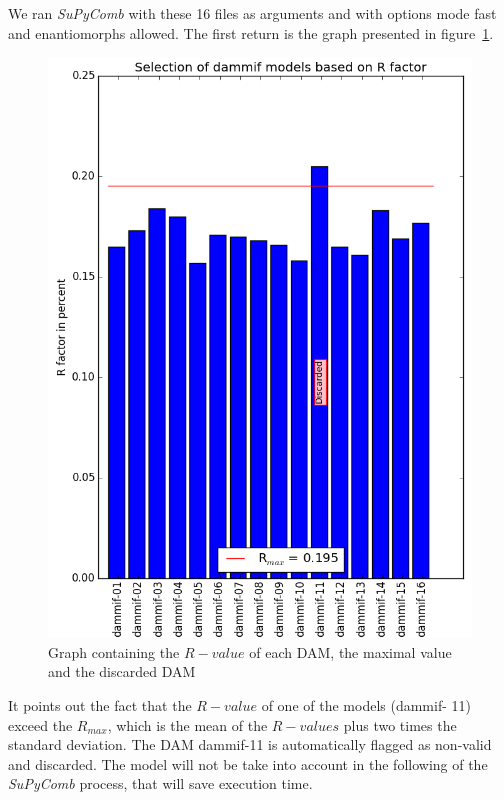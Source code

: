 \documentclass[a4paper, 11pt]{report}
\begin{document}
We ran \textit{SuPyComb} with these 16 files as arguments and with 
options mode fast and enantiomorphs allowed. 
The first return is the graph presented in figure~\ref{fgr:rfactor}. 
\begin{figure}
\centering
\includegraphics[scale=0.6]{Rfactor.png}
\caption{Graph containing the $R-value$ of each DAM, the maximal value 
         and the discarded DAM}
\label{fgr:rfactor}
\end{figure}
It points out the fact that the $R-value$ of one of the models (dammif-
11) exceed the $R_{max}$, which is the mean of the $R-values$ plus two 
times the standard deviation. 
The DAM dammif-11 is automatically flagged as non-valid and discarded. 
The model will not be take into account in the following of the 
\textit{SuPyComb} process, that will save execution time.
\end{document}
